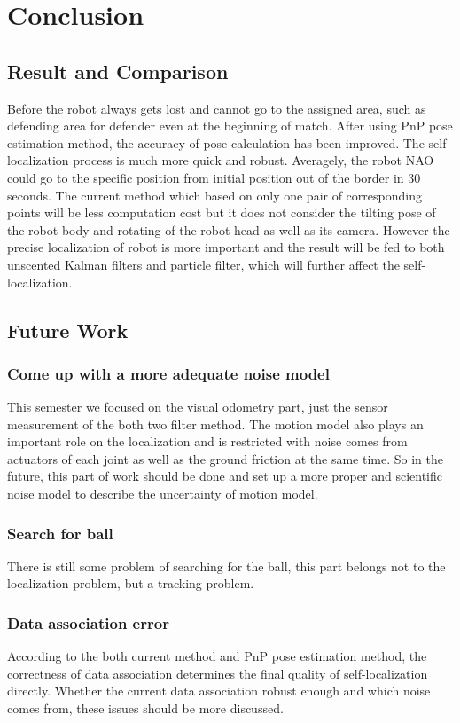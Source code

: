 \chapter{Conclusion}
\section{Result and Comparison}
Before the robot always gets lost and cannot go to the assigned area, such as defending area for defender even at the beginning of match. After using PnP pose estimation method, the accuracy of pose calculation has been improved. The self-localization process is much more quick and robust. Averagely, the robot NAO could go to the specific position from initial position out of the border in 30 seconds. 
The current method which based on only one pair of corresponding points will be less computation cost but it does not consider the tilting pose of the robot body and rotating of the robot head as well as its camera. However the precise localization of robot is more important and the result will be fed to both unscented Kalman filters and particle filter, which will further affect the self-localization.
\section{Future Work}
\subsection{Come up with a more adequate noise model}
This semester we focused on the visual odometry part, just the sensor measurement of the both two filter method. The motion model also plays an important role on the localization and is restricted with noise comes from actuators of each joint as well as the ground friction at the same time. So in the future, this part of work should be done and set up a more proper and scientific noise model to describe the uncertainty of motion model.

\subsection{Search for ball}
There is still some problem of searching for the ball, this part belongs not to the localization problem, but a tracking problem. 

\subsection{Data association error}
According to the both current method and PnP pose estimation method, the correctness of data association determines the final quality of self-localization directly. Whether the current data association robust enough and which noise comes from, these issues should be more discussed.

